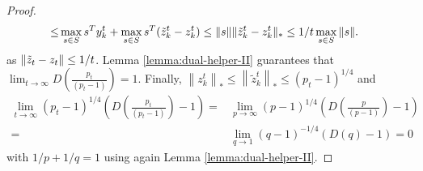 \documentclass[12pt]{article}
\theoremstyle{thmstyleone}%
\theoremstyle{thmstyletwo}%
\theoremstyle{thmstylethree}%
\begin{document}
\begin{appendices}
\begin{proof}
{\begin{align*}
      \leq & \max_{s\in S} s^Ty^t_{k}+\max_{s\in S} s^T(\tilde z^t_k-z_k^t)\leq \| s \|\| \tilde z^t_k-z_k^t \|_* \leq 1/t \max_{s\in S} \| s \| .
    \end{align*}
    as $\| \tilde z_t-z_t \|\leq 1/t$.
  }
  Lemma \ref{lemma:dual-helper-II} guarantees that $\lim_{t\to\infty} D\left(\tfrac{p_t}{(p_t-1)}\right)=1$.
  Finally, $\left\|z^t_{k} \right\|_*\leq \left\|\tilde z^t_{k} \right\|_*\leq (p_t-1)^{1/4}$ and
  \begin{align*}
    \lim_{t\to\infty} (p_t-1)^{1/4} \left(D\left(\tfrac{p_t}{(p_t-1)}\right)-1\right)=& \lim_{p\to\infty} (p-1)^{1/4} \left(D\left(\tfrac{p}{(p-1)}\right)-1\right)\\
    = & \lim_{q\to 1} (q-1)^{-1/4} \left( D(q)-1 \right)=0
  \end{align*}
  with $1/p+1/q=1$ using again Lemma \ref{lemma:dual-helper-II}.
\end{proof}


\end{appendices}
\end{document}
